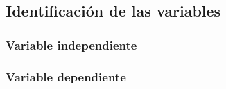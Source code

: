 \subsection{Identificaci\'on de las variables}
\label{cap0:sec:identificacion_de_las_variables}

\subsubsection{Variable independiente}
\label{cap0:sec:variable_independiente}

\subsubsection{Variable dependiente}
\label{cap0:sec:variable_dependiente}



\renewcommand*{\thesection}{\thechapter.\arabic{section}}
\renewcommand*{\thechapter}{\arabic{chapter}}
\makeatletter\renewcommand*{\@chapapp}{\chaptername}\makeatother

